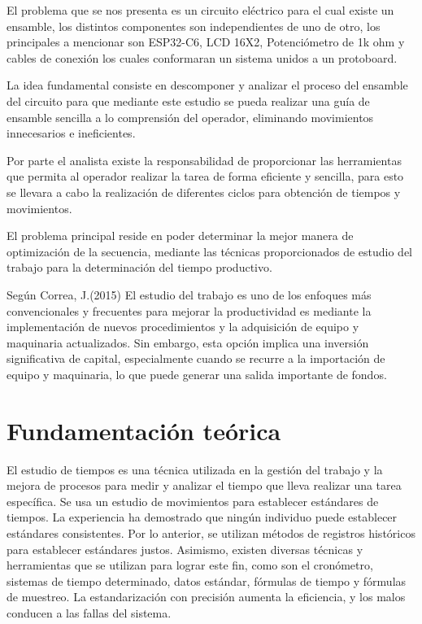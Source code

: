     El problema que se nos presenta es un circuito eléctrico para el cual existe un ensamble, los distintos componentes son independientes de uno de otro, los principales a mencionar son ESP32-C6, LCD 16X2, Potenciómetro de 1k ohm y cables de conexión los cuales conformaran un sistema unidos a un protoboard.
    
    La idea fundamental consiste en descomponer y analizar el proceso del ensamble del circuito para que mediante este estudio se pueda realizar una guía de ensamble sencilla a lo comprensión del operador, eliminando movimientos innecesarios e ineficientes. 
    
    Por parte el analista existe la responsabilidad de proporcionar las herramientas  que permita al operador realizar la tarea de forma eficiente y sencilla, para esto se llevara a cabo la realización de diferentes ciclos para obtención de tiempos y movimientos.
    
    El problema principal reside en poder determinar la mejor manera de optimización de la secuencia, mediante las técnicas proporcionados de estudio del trabajo para la determinación del tiempo productivo. 
    
    Según Correa, J.(2015) El estudio del trabajo es uno de los enfoques más convencionales y frecuentes para mejorar la productividad es mediante la implementación de nuevos procedimientos y la adquisición de equipo y maquinaria actualizados. Sin embargo, esta opción implica una inversión significativa de capital, especialmente cuando se recurre a la importación de equipo y maquinaria, lo que puede generar una salida importante de fondos.\cite{REF6}
    
    \section{Fundamentación teórica}
    El estudio de tiempos es una técnica utilizada en la gestión del
    trabajo y la mejora de procesos para medir y analizar el tiempo que
    lleva realizar una tarea específica. Se usa un estudio de movimientos
    para establecer estándares de tiempos. La experiencia ha demostrado
    que ningún individuo puede establecer estándares consistentes.
    Por lo anterior, se utilizan métodos de registros históricos para
    establecer estándares justos. Asimismo, existen diversas técnicas y
    herramientas que se utilizan para lograr este fin, como son el
    cronómetro, sistemas de tiempo determinado, datos estándar,
    fórmulas de tiempo y fórmulas de muestreo. La estandarización con
    precisión aumenta la eficiencia, y los malos conducen a las fallas del
    sistema.
    
